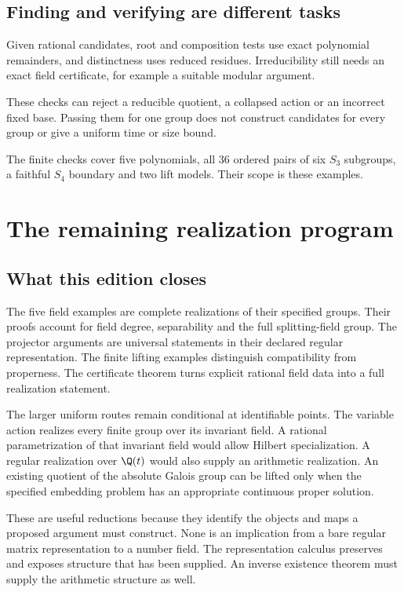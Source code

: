 \section{Finding and verifying are different tasks}

Given rational candidates, root and composition tests use exact polynomial remainders, and distinctness uses reduced residues. Irreducibility still needs an exact field certificate, for example a suitable modular argument.

These checks can reject a reducible quotient, a collapsed action or an incorrect fixed base. Passing them for one group does not construct candidates for every group or give a uniform time or size bound.

The finite checks cover five polynomials, all 36 ordered pairs of six $S_3$ subgroups, a faithful $S_4$ boundary and two lift models. Their scope is these examples.

\chapter{The remaining realization program}
\label{chap:g08-program}

\section{What this edition closes}

The five field examples are complete realizations of their specified groups. Their proofs account for field degree, separability and the full splitting-field group. The projector arguments are universal statements in their declared regular representation. The finite lifting examples distinguish compatibility from properness. The certificate theorem turns explicit rational field data into a full realization statement.

The larger uniform routes remain conditional at identifiable points. The variable action realizes every finite group over its invariant field. A rational parametrization of that invariant field would allow Hilbert specialization. A regular realization over $\Q(t)$ would also supply an arithmetic realization. An existing quotient of the absolute Galois group can be lifted only when the specified embedding problem has an appropriate continuous proper solution.

These are useful reductions because they identify the objects and maps a proposed argument must construct. None is an implication from a bare regular matrix representation to a number field. The representation calculus preserves and exposes structure that has been supplied. An inverse existence theorem must supply the arithmetic structure as well.

